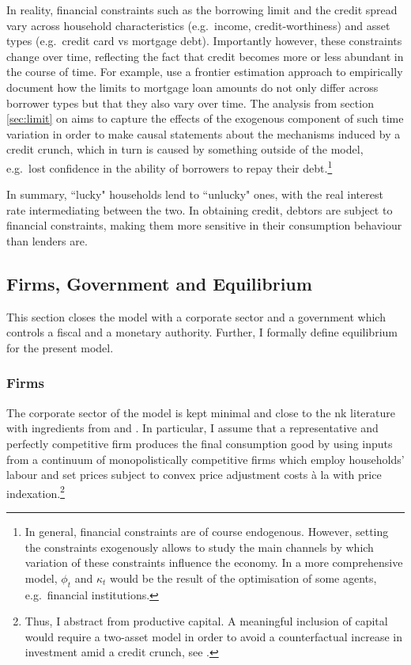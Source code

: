 \documentclass[a4paper,12pt]{article} %
\numberwithin{equation}{section} %
\numberwithin{figure}{section}
\numberwithin{table}{section}
\begin{document}
In reality, financial constraints such as the borrowing limit and the credit spread vary across household characteristics (e.g.~income, credit-worthiness) and asset types (e.g.~credit card vs mortgage debt). Importantly however, these constraints change over time, reflecting the fact that credit becomes more or less abundant in the course of time. For example, \textcite{anenberg2018} use a frontier estimation approach to empirically document how the limits to mortgage loan amounts do not only differ across borrower types but that they also vary over time. The analysis from section \ref{sec:limit} on aims to capture the effects of the exogenous component of such time variation in order to make causal statements about the mechanisms induced by a credit crunch, which in turn is caused by something outside of the model, e.g.~lost confidence in the ability of borrowers to repay their debt.\footnote{In general, financial constraints are of course endogenous. However, setting the constraints exogenously allows to study the main channels by which variation of these constraints influence the economy. In a more comprehensive model, $\phi_t$ and $\kappa_t$ would be the result of the optimisation of some agents, e.g.~financial institutions.}

In summary, ``lucky" households lend to ``unlucky" ones, with the real interest rate intermediating between the two. In obtaining credit, debtors are subject to financial constraints, making them more sensitive in their consumption behaviour than lenders are.

\subsection{Firms, Government and Equilibrium}
\label{sec:model-sectors}

This section closes the model with a corporate sector and a government which controls a fiscal and a monetary authority. Further, I formally define equilibrium for the present model.

\subsubsection{Firms}
\label{sec:model-firms}

The corporate sector of the model is kept minimal and close to the \Gls{nk} literature with ingredients from \textcite{gust2017wp} and \textcite{mckay2016}. In particular, I assume that a representative and perfectly competitive firm produces the final consumption good by using inputs from a continuum of monopolistically competitive firms which employ households' labour and set prices subject to convex price adjustment costs à la \textcite{rotemberg1982} with price indexation.\footnote{Thus, I abstract from productive capital. A meaningful inclusion of capital would require a two-asset model in order to avoid a counterfactual increase in investment amid a credit crunch, see \textcite{kv2018}.}
\end{document}
